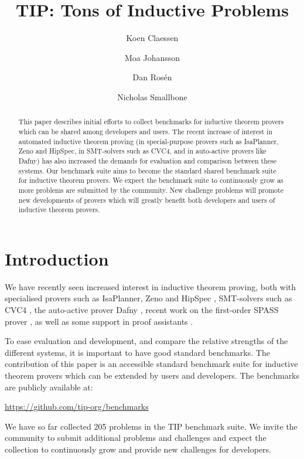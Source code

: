 \documentclass{llncs}
\begin{document}
\title{TIP: Tons of Inductive Problems}

\author{Koen Claessen \and Moa Johansson \and Dan Ros\'en \and Nicholas Smallbone}

\titlerunning{}

\maketitle

\begin{abstract}
This paper describes initial efforts to collect benchmarks for 
inductive theorem provers which can be shared among developers 
and users. The recent increase of interest in automated 
inductive theorem proving (in special-purpose provers such 
as IsaPlanner, Zeno and HipSpec, in SMT-solvers such as CVC4, 
and in auto-active provers like Dafny) has also increased the 
demands for evaluation and comparison between these systems. Our 
benchmark suite aims to become the standard shared benchmark 
suite for inductive theorem provers. We expect the benchmark 
suite to continuously grow as more problems are submitted by the 
community. New challenge problems will promote new developments 
of provers which will greatly benefit both developers and users 
of inductive theorem provers.
\end{abstract}

\section{Introduction}

We have recently seen increased interest in inductive theorem proving, both with specialised provers such as IsaPlanner, Zeno and HipSpec \cite{hipspecCADE,dixon2007isaplanner,zeno}, SMT-solvers such as CVC4 \cite{cvc4}, the auto-active prover Dafny \cite{dafny}, recent work on the first-order SPASS prover \cite{SPASSInduction}, as well as some support in proof assistants \cite{hipster,acl2}.

To ease evaluation and development, and compare the relative strengths of the different systems, it is important to have good standard benchmarks. The contribution of this paper is an accessible standard benchmark suite for inductive theorem provers which can be extended by users and developers. The benchmarks are publicly available at:
\begin{center}
\url{https://github.com/tip-org/benchmarks}
\end{center}
We have so far collected 205 problems in the TIP benchmark suite. We invite the community to submit additional problems and challenges and expect the collection to continuously grow and provide new challenges for developers.
\end{document}
